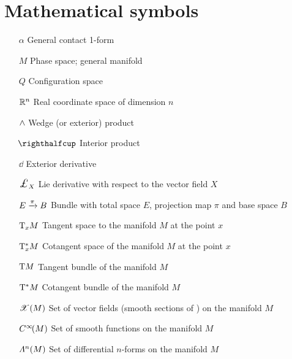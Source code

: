 \section*{Mathematical symbols}
\begin{itemize}[itemsep=0pt, leftmargin=2cm, labelsep=0cm, labelwidth=1.9cm, align=left]
    \item[$\alpha$] General contact 1-form
%
    \item[$M$] Phase space; general manifold
    \item[$Q$] Configuration space
%
    \item[$\mathbb{R}^n$] Real coordinate space of dimension $n$
%
%
    \item[$ \wedge $]  Wedge (or exterior) product
    \item[$\intpr{}{}$]  Interior product
    \item[$\dd{}$]  Exterior derivative
    \item[$\lied{X}{}$]  Lie derivative with respect to the vector field $X$
    \item[$E\xrightarrow[]{\pi}B$]  Bundle with total space $E$, projection map $\pi$ and base space $B$
    \item[$\mathrm{T}_{x}M$]  Tangent space to the manifold $M$ at the point $x$
    \item[$\mathrm{T}_{x}^*M$]  Cotangent space of the manifold $M$ at the point $x$
    \item[$\mathrm{T}M$]  Tangent bundle of the manifold $M$
    \item[$\mathrm{T}^*M$]  Cotangent bundle of the manifold $M$
    \item[$\mathscr{X}\qty(M)$]  Set of vector fields (smooth sections of ) on the manifold $M$
    \item[$C^\infty\!\qty(M)$]  Set of smooth functions on the manifold $M$
    \item[$\Lambda^{n}(M)$]  Set of differential $n$-forms on the manifold $M$
\end{itemize}